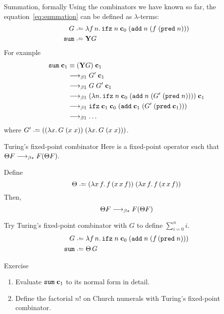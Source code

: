 \begin{frame}{Summation, formally}
  Using the combinators we have known so far, the equation~\eqref{eq:summation}
  can be defined as $\lambda$-terms:
  \begin{align*}
    G \defeq{} & 
    \lambda f\,n.\, \mathtt{ifz}\;n\;\bc_0\;
    (\add\;n\;(f\;(\mathtt{pred}\;n))) \\
    \mathtt{sum} \defeq{} & \mathbf{Y}G
  \end{align*}
  For example
  \begin{align*}
    \mathtt{sum}\;\mathbf{c}_1
      &\equiv  (\mathbf{Y}G)\;\mathbf{c}_1 \\
      &\longrightarrow_{\beta1} G'\;\mathbf{c}_1 \\
      &\longrightarrow_{\beta1} G\;G'\;\mathbf{c}_1 \\
      &\longrightarrow_{\beta1} (\lambda n.\, \mathtt{ifz}\;n\;\mathbf{c}_0\;
      (\mathtt{add}\;n\;(G'\;(\mathtt{pred}\;n))))\;\mathbf{c}_1 \\
      &\longrightarrow_{\beta1} \mathtt{ifz}\;\mathbf{c}_1\;\mathbf{c}_0\;
      (\mathtt{add}\;\mathbf{c}_1\;(G'\;(\mathtt{pred}\;\mathbf{c}_1))) \\
      &\longrightarrow_{\beta1} \dots
  \end{align*}
  where
  $G' \defeq ((\lambda x.\, G\;(x\;x))\;(\lambda x.\,G\;(x\;x)))$.
\end{frame}
  
\begin{frame}{Turing's fixed-point combinator}
Here is a fixed-point operator such that $\Theta F \longrightarrow_{\beta*} F(\Theta F)$.
\begin{proposition}
  Define 
  \[
    \Theta \defeq 
    (\lambda x\,f.\,f\,(x\,x\,f))\;
    (\lambda x\,f.\,f\,(x\,x\,f))
  \]
  Then, 
  \[
    \Theta F \longrightarrow_{\beta*} F (\Theta F)
  \]
\end{proposition}
Try Turing's fixed-point combinator with $G$ to define $\sum_{i=0}^n i$.
\begin{align*}
  G \defeq{} &
  \lambda f\,n.\,
  \mathtt{ifz}\;n\;\bc_0\;
  (\add\;n\;(f\,(\mathtt{pred}\;n))) \\
  \mathtt{sum} \defeq\; & \Theta\,G 
\end{align*}
\end{frame}

\begin{frame}{Exercise}
  \begin{enumerate}
    \item Evaluate $\mathtt{sum}\;\mathbf{c}_1$ to its normal form in detail.
    \item Define the factorial $n!$ on Church numerals with Turing's fixed-point combinator.
  \end{enumerate}
\end{frame}


